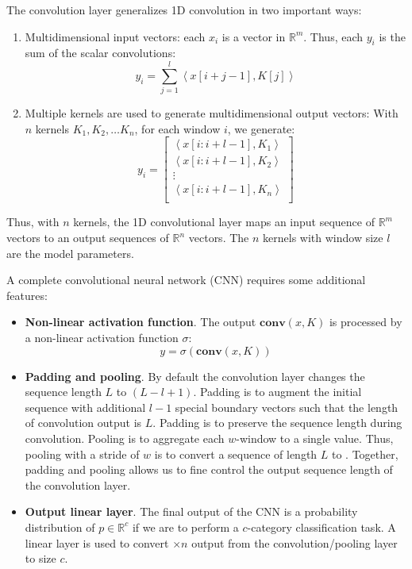 The convolution layer generalizes 1D convolution in two important ways:

\begin{enumerate}
    \item Multidimensional input vectors:  each $x_i$ is a vector in $\mathbb{R}^m$.
    Thus, each $y_i$ is the sum of the scalar convolutions:
    $$
    y_i = \sum_{j=1}^l \left<x[i+j-1], K[j]\right>
    $$
    \item Multiple kernels are used to generate multidimensional output vectors:
    With $n$ kernels $K_1, K_2, \dots K_n$, for each window $i$, we generate:
    $$
    y_i = \left[\begin{array}{c}
    \left<x[i:i+l-1], K_1\right> \\
    \left<x[i:i+l-1], K_2\right> \\
    \vdots \\
    \left<x[i:i+l-1], K_n\right> \\
    \end{array}
    \right]
    $$
\end{enumerate}

Thus, with $n$ kernels, the 1D convolutional layer maps an input sequence of $\mathbb{R}^m$ vectors to an output sequences of $\mathbb{R}^n$ vectors.  The $n$ kernels with window size $l$ are the model parameters.

A complete convolutional neural network (CNN) requires some additional features:

\begin{itemize}
    \item {\bf Non-linear activation function}.  The output $\mathbf{conv}(x, K)$ is processed by
    a non-linear activation function $\sigma$:
    $$ y = \sigma(\mathbf{conv}(x, K))$$

    \item {\bf Padding and pooling}. By default the convolution layer changes the sequence length
    $L$ to $(L-l+1)$.  Padding is to augment the initial sequence with additional $l-1$ special 
    boundary vectors such that the length of convolution output is $L$.  Padding is to preserve the sequence length during convolution.  
    Pooling is to aggregate each $w$-window to a single value.  Thus, pooling with a stride of $w$ is to convert a sequence of length $L$ to .
    Together, padding and pooling allows us to fine control the output sequence length of the convolution layer.

    \item {\bf Output linear layer}.  The final output of the CNN is a probability distribution
    of $p\in\mathbb{R}^c$ if we are to perform a $c$-category classification task.  A linear layer is used
    to convert $\times n$ output from the convolution/pooling layer to size $c$.
\end{itemize}

